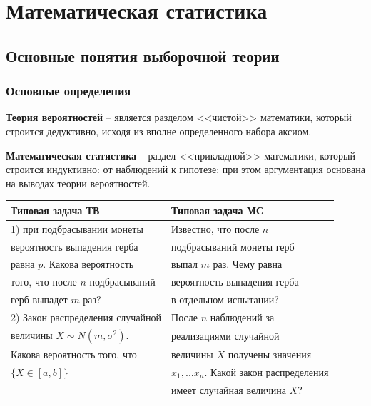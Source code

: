 \chapter{Математическая статистика}

\section{Основные понятия выборочной теории}

\subsection{Основные определения}

\textbf{Теория вероятностей} -- является разделом <<чистой>> математики,
который строится дедуктивно, исходя из вполне определенного
набора аксиом.

\textbf{Математическая статистика} -- раздел <<прикладной>> математики,
который строится индуктивно: от наблюдений к гипотезе; при этом
аргументация основана на выводах теории вероятностей.

\begin{table}[H]
    \centering
    \begin{tabular}{|l|l|}
        \hline
        Типовая задача ТВ & Типовая задача МС \\
        \hline
        1) при подбрасывании монеты & Известно, что после $n$ \\
        вероятность выпадения герба & подбрасываний монеты герб \\
        равна $p$. Какова вероятность & выпал $m$ раз. Чему равна \\
        того, что после $n$ подбрасываний & вероятность выпадения герба \\
        герб выпадет $m$ раз? & в отдельном испытании? \\
        \hline
        2) Закон распределения случайной & После $n$ наблюдений за \\
        величины $X \sim N(m, \sigma^2)$. & реализациями случайной \\
        Какова вероятность того, что & величины $X$ получены значения \\
        $\{ X \in [a,b] \}$ & $x_1, ...x_n$. Какой закон распределения \\
                            & имеет случайная величина $X$? \\
        \hline
    \end{tabular}
\end{table}


